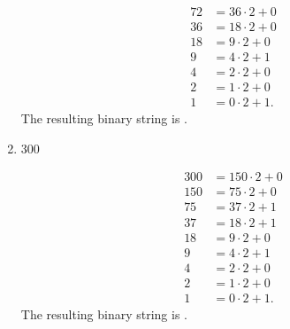 \documentclass[letterpaper]{article}
\begin{document}
\begin{mdframed}
\begin{enumerate}
\begin{mdframed}
\begin{equation*}
\begin{aligned}
                    72 &= 36 \cdot 2 + 0 \\ 
                    36 &= 18 \cdot 2 + 0 \\ 
                    18 &= 9 \cdot 2 + 0 \\ 
                    9 &= 4 \cdot 2 + 1 \\ 
                    4 &= 2 \cdot 2 + 0 \\ 
                    2 &= 1 \cdot 2 + 0 \\ 
                    1 &= 0 \cdot 2 + 1.
                \end{aligned}
            \end{equation*}
            The resulting binary string is .
        \end{mdframed}
        \item 300 
        \begin{mdframed}
            \begin{equation*}
                \begin{aligned}
                    300 &= 150 \cdot 2 + 0 \\ 
                    150 &= 75 \cdot 2 + 0 \\ 
                    75 &= 37 \cdot 2 + 1 \\ 
                    37 &= 18 \cdot 2 + 1 \\ 
                    18 &= 9 \cdot 2 + 0 \\ 
                    9 &= 4 \cdot 2 + 1 \\ 
                    4 &= 2 \cdot 2 + 0 \\ 
                    2 &= 1 \cdot 2 + 0 \\ 
                    1 &= 0 \cdot 2 + 1.
                \end{aligned}
            \end{equation*}
            The resulting binary string is .
        \end{mdframed}
    \end{enumerate}
\end{mdframed}
\end{document}
